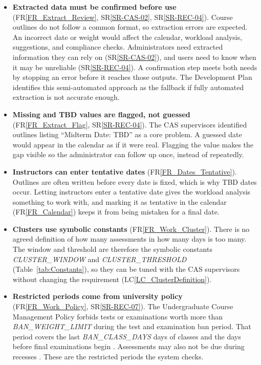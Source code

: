 \documentclass[12pt]{article}
\newcommand{\srref}[1]{SR\ref{#1}}
\newcommand{\rref}[1]{FR\ref{#1}}
\newcommand{\lcref}[1]{LC\ref{#1}}
\begin{document}
\begin{itemize}
\item \textbf{Extracted data must be confirmed before use}
  (\rref{FR_Extract_Review}, \srref{SR-CAS-02}, \srref{SR-REC-04}). Course
  outlines do not follow a common format, so extraction errors are expected. An
  incorrect date or weight would affect the calendar, workload analysis,
  suggestions, and compliance checks. Administrators need extracted information
  they can rely on (\srref{SR-CAS-02}), and users need to know when it may be
  unreliable (\srref{SR-REC-04}). A confirmation step meets both needs by
  stopping an error before it reaches those outputs. The Development
  Plan~\citep{TeamBVSH2026DP} identifies this semi-automated approach as the fallback if fully automated
  extraction is not accurate enough.

\item \textbf{Missing and TBD values are flagged, not guessed}
  (\rref{FR_Extract_Flag}, \srref{SR-REC-04}). The CAS supervisors identified
  outlines listing ``Midterm Date: TBD'' as a core problem. A guessed date
  would appear in the calendar as if it were real. Flagging the value makes the
  gap visible so the administrator can follow up once, instead of repeatedly.

\item \textbf{Instructors can enter tentative dates} (\rref{FR_Dates_Tentative}).
  Outlines are often written before every date is fixed, which is why TBD dates
  occur. Letting instructors enter a tentative date gives the workload analysis
  something to work with, and marking it as tentative in the calendar
  (\rref{FR_Calendar}) keeps it from being mistaken for a final date.

\item \textbf{Clusters use symbolic constants} (\rref{FR_Work_Cluster}).
  There is no agreed definition of how many assessments in how many days is
  too many. The window and threshold are therefore the symbolic constants
  \textit{CLUSTER\_\allowbreak{}WINDOW} and
  \textit{CLUSTER\_\allowbreak{}THRESHOLD} (Table~\ref{tab:Constants}), so they
  can be tuned with the CAS supervisors without changing the requirement
  (\lcref{LC_ClusterDefinition}).

\item \textbf{Restricted periods come from university policy}
(\rref{FR_Work_Policy}, \srref{SR-REC-07}). The Undergraduate Course Management
Policy forbids tests or examinations worth more than
\textit{BAN\_\allowbreak{}WEIGHT\_\allowbreak{}LIMIT} during the test and
examination ban period. That period covers the last
\textit{BAN\_\allowbreak{}CLASS\_\allowbreak{}DAYS} days of classes and the days
before final examinations begin \citep{McMasterUCMP2025}. Assessments may also
not be due during recesses \citep{McMasterUCMP2025}. These are the restricted
periods the system checks.


\end{itemize}
\end{document}
